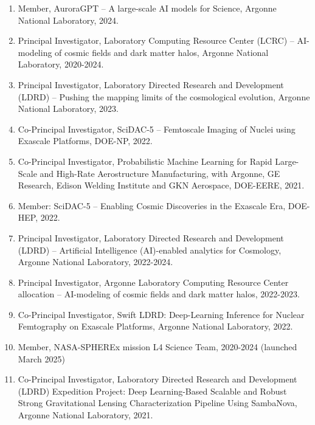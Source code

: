 \documentclass[letterpaper]{article}
\begin{document}
\begin{enumerate}

\item Member, AuroraGPT -- A large-scale AI models for Science, Argonne National Laboratory, 2024.

\item Principal Investigator, Laboratory Computing Resource Center (LCRC) -- AI-modeling of cosmic fields and dark matter halos, Argonne National Laboratory, 2020-2024.

\item Principal Investigator, Laboratory Directed Research and Development (LDRD) -- Pushing the mapping limits of the cosmological evolution, Argonne National Laboratory, 2023. 

\item Co-Principal Investigator, SciDAC-5 -- Femtoscale Imaging of Nuclei using Exascale Platforms, DOE-NP, 2022.

\item Co-Principal Investigator, Probabilistic Machine Learning for Rapid Large-Scale and High-Rate Aerostructure Manufacturing, with Argonne, GE Research, Edison Welding Institute and GKN Aerospace, DOE-EERE, 2021.  
 
\item Member: SciDAC-5 -- Enabling Cosmic Discoveries in the Exascale Era, DOE-HEP, 2022.

\item Principal Investigator, Laboratory Directed Research and Development (LDRD) -- Artificial Intelligence (AI)-enabled analytics for Cosmology, Argonne National Laboratory, 2022-2024.  

\item Principal Investigator, Argonne Laboratory Computing Resource Center allocation -- AI-modeling of cosmic fields and dark matter halos, 2022-2023.
 
\item Co-Principal Investigator, Swift LDRD: Deep-Learning Inference for Nuclear Femtography on Exascale Platforms, Argonne National Laboratory, 2022. 

\item Member, NASA-SPHEREx mission L4 Science Team, 2020-2024 (launched March 2025)
 
\item Co-Principal Investigator, Laboratory Directed Research and Development (LDRD) Expedition Project: Deep Learning-Based Scalable and Robust Strong Gravitational Lensing Characterization Pipeline Using SambaNova, Argonne National Laboratory, 2021.
  

\end{enumerate}
\end{document}
